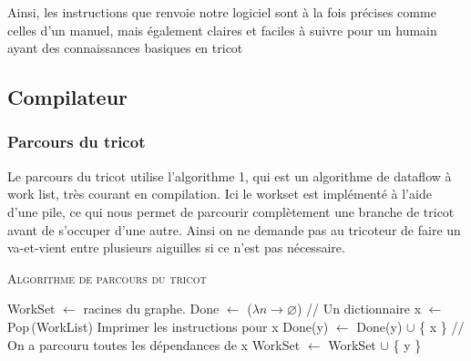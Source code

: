\documentclass{article}
\begin{document}

Ainsi, les instructions que renvoie notre logiciel sont à la fois précises comme celles d'un manuel, mais 
également claires et faciles à suivre pour un humain ayant des connaissances basiques en tricot 

\subsection{Compilateur} %


\subsubsection{Parcours du tricot}

Le parcours du tricot utilise l'algorithme 1, qui est un algorithme de
dataflow à work list, très courant en compilation. Ici le workset est
implémenté à l'aide d'une pile, ce qui nous permet de parcourir
complètement une branche de tricot avant de s'occuper d'une
autre. Ainsi on ne demande pas au tricoteur de faire un va-et-vient
entre plusieurs aiguilles si ce n'est pas nécessaire.

\begin{algorithm}\label{algo}
\caption{\textsc{Algorithme de parcours du tricot}}
\begin{algorithmic}[1]
\State WorkSet $\leftarrow$ racines du graphe.
\State Done $\leftarrow$ ($\lambda n \to \varnothing$) // Un dictionnaire
  \State x $\leftarrow$ Pop\,(WorkList)
  \State Imprimer les instructions pour x
    \State Done(y) $\leftarrow$ Done(y) $\cup$ \{ x \}
     // On a parcouru toutes les dépendances de x
      \State WorkSet $\leftarrow$ WorkSet $\cup$ \{ y \}
    \EndIf
  \EndFor


\EndWhile

\end{algorithmic}
\end{algorithm}
\end{document}

